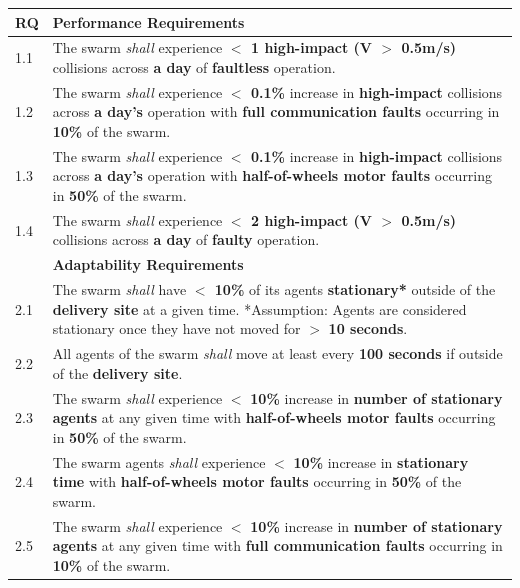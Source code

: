 \documentclass[runningheads]{llncs}
\begin{document}
\begin{table}[!t]
	\centering
	\begin{tabular}{p{5mm} p{116mm} }
		RQ & \textbf{Performance Requirements}\\
		\hline
		1.1 & The swarm \emph{shall} experience \textbf{$<$ 1 high-impact (V $>$ 0.5m/s)} collisions across \textbf{a day} of \textbf{faultless} operation. \\ 
		\hline
		1.2 & The swarm \emph{shall} experience \textbf{$<$ 0.1\%} increase in \textbf{high-impact} collisions across \textbf{a day's} operation with \textbf{full communication faults} occurring in \textbf{10\%} of the swarm.\\ 
		\hline
		1.3 & The swarm \emph{shall} experience \textbf{$<$ 0.1\%} increase in \textbf{high-impact} collisions across \textbf{a day's} operation with \textbf{half-of-wheels motor faults} occurring in \textbf{50\%} of the swarm.	\\	
		\hline
		1.4 & The swarm \emph{shall} experience \textbf{$<$ 2 high-impact (V $>$ 0.5m/s)} collisions across \textbf{a day} of \textbf{faulty} operation.  \\		[1ex] 		
		\hline
		& \textbf{Adaptability Requirements}\\
		\hline
		2.1 & The swarm \emph{shall} have \textbf{$<$ 10\%} of its agents \textbf{stationary*} outside of the \textbf{delivery site} at a given time.
		*Assumption: Agents are considered stationary once they have not moved for $>$ \textbf{10 seconds}.
		\\ 
		\hline
		2.2 & All agents of the swarm \emph{shall} move at least every \textbf{100 seconds} if outside of the \textbf{delivery site}.\\ 
		\hline
		2.3 & The swarm \emph{shall} experience $<$ \textbf{10\%} increase in \textbf{number of stationary agents} at any given time with \textbf{half-of-wheels motor faults} occurring in \textbf{50\%} of the swarm. \\
		\hline
		2.4 & The swarm agents \emph{shall} experience $<$ \textbf{10\%} increase in \textbf{stationary time} with \textbf{half-of-wheels motor faults} occurring in \textbf{50\%} of  the swarm.\\ 
		\hline
		2.5 & The swarm \emph{shall} experience $<$ \textbf{10\%} increase in \textbf{number of stationary agents} at any given time with \textbf{full communication faults} occurring in \textbf{10\%} of the swarm.\\

\end{tabular}
\end{table}
\end{document}

